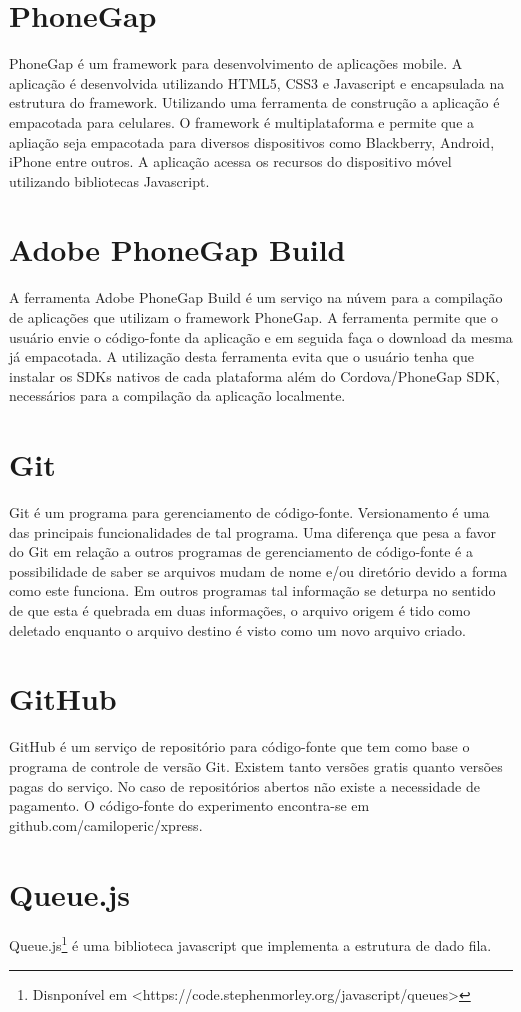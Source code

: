 \section{PhoneGap}
PhoneGap é um framework para desenvolvimento de aplicações mobile. A aplicação é desenvolvida utilizando HTML5, CSS3 e Javascript e encapsulada na estrutura do framework. Utilizando uma ferramenta de construção a aplicação é empacotada para celulares. O framework é multiplataforma e permite que a apliação seja empacotada para diversos dispositivos como Blackberry, Android, iPhone entre outros. A aplicação acessa os recursos do dispositivo móvel utilizando bibliotecas Javascript.

\section{Adobe PhoneGap Build}
A ferramenta Adobe PhoneGap Build é um serviço na núvem para a compilação de aplicações que utilizam o framework PhoneGap. A ferramenta permite que o usuário envie o código-fonte da aplicação e em seguida faça o download da mesma já empacotada. A utilização desta ferramenta evita que o usuário tenha que instalar os SDKs nativos de cada plataforma além do Cordova/PhoneGap SDK, necessários para a compilação da aplicação localmente.

\section{Git}
Git é um programa para gerenciamento de código-fonte. Versionamento é uma das principais funcionalidades de tal programa. Uma diferença que pesa a favor do Git em relação a outros programas de gerenciamento de  código-fonte é a possibilidade de saber se arquivos mudam de nome e/ou diretório devido a forma como este funciona. Em outros programas tal informação se deturpa no sentido de que esta é quebrada em duas informações, o arquivo origem é tido como deletado enquanto o arquivo destino é visto como um novo arquivo criado.

\section{GitHub}
GitHub é um serviço de repositório para código-fonte que tem como base o programa de controle de versão Git. Existem tanto versões gratis quanto versões pagas do serviço. No caso de repositórios abertos não existe a necessidade de pagamento. O código-fonte do experimento encontra-se em github.com/camiloperic/xpress.

\section{Queue.js}
Queue.js\footnote{Disnponível em <https://code.stephenmorley.org/javascript/queues>} é uma biblioteca javascript que implementa a estrutura de dado fila.
